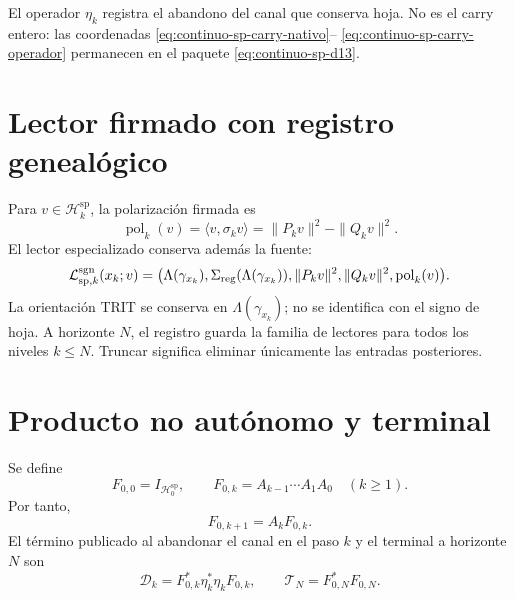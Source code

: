 El operador \(\eta_k\) registra el abandono del canal que conserva hoja. No
es el carry entero: las coordenadas
\eqref{eq:continuo-sp-carry-nativo}--
\eqref{eq:continuo-sp-carry-operador} permanecen en el paquete
\eqref{eq:continuo-sp-d13}.

\fi
\section{Lector firmado con registro genealógico}

Para \(v\in\mathcal H_k^{\mathrm{sp}}\), la polarización firmada es
\begin{equation}
\label{eq:continuo-sp-polarizacion-firmada}
 \operatorname{pol}_k(v)
 =\langle v,\sigma_kv\rangle
 =\|P_kv\|^2-\|Q_kv\|^2.
\end{equation}
El lector especializado conserva además la fuente:
\begin{equation}
\label{eq:continuo-sp-lector-firmado}
 \mathcal L^{\rm sgn}_{\mathrm{sp},k}(x_k;v)
 =\bigl(
   \Lambda(\gamma_{x_k}),
   \Sigma_{\rm reg}(\Lambda(\gamma_{x_k})),
   \|P_kv\|^2,
   \|Q_kv\|^2,
   \operatorname{pol}_k(v)\bigr).
\end{equation}
La orientación TRIT se conserva en \(\Lambda(\gamma_{x_k})\); no se
identifica con el signo de hoja. A horizonte \(N\), el registro guarda la
familia de lectores para todos los niveles \(k\leq N\). Truncar significa
eliminar únicamente las entradas posteriores.

\section{Producto no autónomo y terminal}

Se define
\begin{equation}
\label{eq:continuo-sp-f-producto}
 F_{0,0}=I_{\mathcal H_0^{\mathrm{sp}}},
 \qquad
 F_{0,k}=A_{k-1}\cdots A_1A_0
 \quad(k\geq1).
\end{equation}
Por tanto,
\begin{equation}
\label{eq:continuo-sp-f-recursion}
 F_{0,k+1}=A_kF_{0,k}.
\end{equation}
El término publicado al abandonar el canal en el paso \(k\) y el terminal a
horizonte \(N\) son
\begin{equation}
\label{eq:continuo-sp-defecto-terminal}
 \mathcal D_k=F_{0,k}^*\eta_k^*\eta_kF_{0,k},
 \qquad
 \mathcal T_N=F_{0,N}^*F_{0,N}.
\end{equation}

